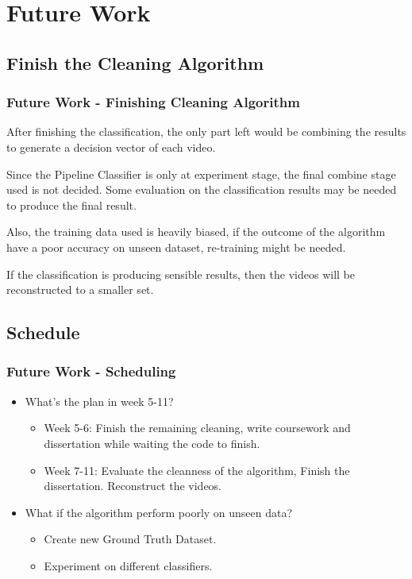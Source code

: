 \documentclass{beamer}[fullspacing]
\begin{document}
\section{Future Work}
\subsection{Finish the Cleaning Algorithm}
\begin{frame}
\frametitle{Future Work - Finishing Cleaning Algorithm}
After finishing the classification, the only part left would be combining the results to generate a decision vector of each video. 

Since the Pipeline Classifier is only at experiment stage, the final combine stage used is not decided. Some evaluation on the classification results may be needed to produce the final result.

Also, the training data used is heavily biased, if the outcome of the algorithm have a poor accuracy on unseen dataset, re-training might be needed.

If the classification is producing sensible results, then the videos will be reconstructed to a smaller set.

\end{frame}

\subsection{Schedule}
\begin{frame}
\frametitle{Future Work - Scheduling}
\begin{itemize}
\item What's the plan in week 5-11?
	\begin{itemize}
	\item Week 5-6: Finish the remaining cleaning, write coursework and dissertation while waiting the code to finish.
	\item Week 7-11: Evaluate the cleanness of the algorithm, Finish the dissertation. Reconstruct the videos.
	\end{itemize}
	
\item What if the algorithm perform poorly on unseen data?
	\begin{itemize}
	\item Create new Ground Truth Dataset.
	\item Experiment on different classifiers.
	\end{itemize}
\end{itemize}
\end{frame}
\end{document}

